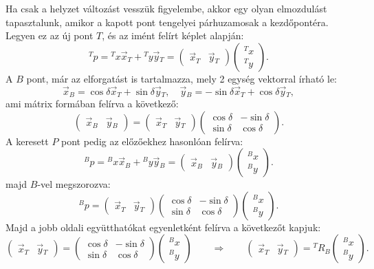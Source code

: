 Ha csak a helyzet változást vesszük figyelembe, akkor egy olyan elmozdulást tapasztalunk, amikor a kapott pont tengelyei párhuzamosak a kezdőpontéra. Legyen ez az új pont $ T $, és az imént felírt képlet alapján:
\[
{}^{T}p = {}^{T}x\vec{x}{}_{T} + {}^{T}y\vec{y}{}_{T} =
\begin{pmatrix}
\vec{x}{}_{T} & \vec{y}{}_{T}
\end{pmatrix}
\begin{pmatrix}
{}^{T}x\\
{}^{T}y
\end{pmatrix}.
\]
A $B$ pont, már az elforgatást is tartalmazza, mely 2 egység vektorral írható le:
\[
\vec{x}{}_{B} = \cos\delta\vec{x}{}_{T} + \sin\delta\vec{y}{}_{T},
\quad
\vec{y}{}_{B} = -\sin\delta\vec{x}{}_{T} + \cos\delta\vec{y}{}_{T},
\]
ami mátrix formában felírva a következő:
\[
\begin{pmatrix}
\vec{x}{}_{B} & \vec{y}{}_{B}
\end{pmatrix}
=
\begin{pmatrix}
\vec{x}{}_{T} & \vec{y}{}_{T}
\end{pmatrix}
\begin{pmatrix}
\cos\delta & -\sin\delta\\
\sin\delta & \cos\delta
\end{pmatrix}.
\]
A keresett $P$ pont pedig az előzőekhez hasonlóan felírva:
\[
{}^{B}p = {}^{B}x\vec{x}{}_{B} + {}^{B}y\vec{y}{}_{B} =
\begin{pmatrix}
\vec{x}{}_{B} & \vec{y}{}_{B}
\end{pmatrix}
\begin{pmatrix}
{}^{B}x\\
{}^{B}y
\end{pmatrix}.
\]
majd $B$-vel megszorozva:
\[
{}^{B}p =
\begin{pmatrix}
\vec{x}{}_{T} & \vec{y}{}_{T}
\end{pmatrix}
\begin{pmatrix}
\cos\delta & -\sin\delta\\
\sin\delta & \cos\delta
\end{pmatrix}
\begin{pmatrix}
{}^{B}x\\
{}^{B}y
\end{pmatrix}.
\]
Majd a jobb oldali együtthatókat egyenletként felírva a következőt kapjuk:
\[
\begin{pmatrix}
\vec{x}{}_{T} & \vec{y}{}_{T}
\end{pmatrix}
=
\begin{pmatrix}
\cos\delta & -\sin\delta\\
\sin\delta & \cos\delta
\end{pmatrix}
\begin{pmatrix}
{}^{B}x\\
{}^{B}y
\end{pmatrix}
\qquad \Rightarrow \qquad
\begin{pmatrix}
\vec{x}{}_{T} & \vec{y}{}_{T}
\end{pmatrix}
=
{}^{T}R{}_{B}
\begin{pmatrix}
{}^{B}x\\
{}^{B}y
\end{pmatrix}.
\]

